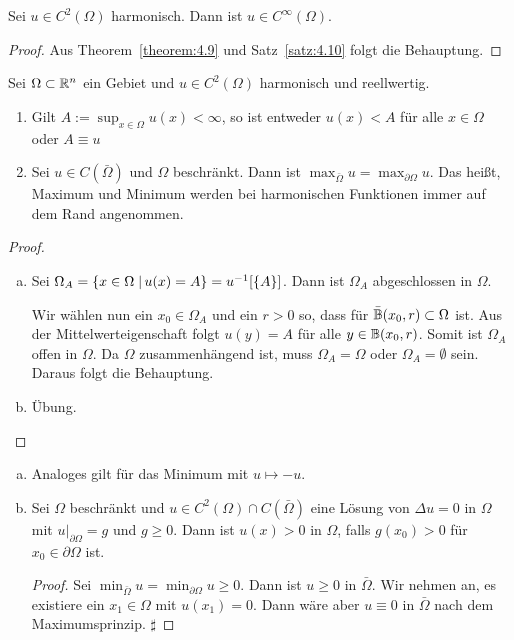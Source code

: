 \begin{kor}
  \label{kor:4.11}
  Sei $u\in C^2(\Omega)$ harmonisch. Dann ist $u\in C^\infty(\Omega)$.
\end{kor}

\begin{proof}
  Aus Theorem~\ref{theorem:4.9} und Satz~\ref{satz:4.10} folgt die Behauptung.
\end{proof}

\begin{theorem}
  \label{theorem:4.12}
  Sei $\Omega\subset\mathbb{R}^n$ ein Gebiet und $u\in C^2(\Omega)$ harmonisch und reellwertig.
  \begin{enumerate}[\rm(a)]
  \item Gilt $A:=\sup_{x\in\Omega}u(x)<\infty$, so ist entweder $u(x)<A$ für alle $x\in\Omega$ oder $A\equiv u$
  \item Sei $u\in C(\bar\Omega)$ und $\Omega$ beschränkt. Dann ist $\max_{\bar\Omega}u=\max_{\partial\Omega}u$. Das heißt, Maximum und Minimum werden bei harmonischen Funktionen immer auf dem Rand angenommen.
  \end{enumerate}
\end{theorem}

\begin{proof}
  \begin{enumerate}[(a)]
  \item Sei $\Omega_A=\{x\in\Omega\;\vert\, u(x)=A\}=u^{-1}[\{A\}]$. Dann ist $\Omega_A$ abgeschlossen in $\Omega$. 

    Wir wählen nun ein $x_0\in\Omega_A$ und ein $r>0$ so, dass für $\bar{\mathbb{B}}(x_0,r)\subset\Omega$ ist. Aus der Mittelwerteigenschaft folgt $u(y)=A$ für alle $y\in\mathbb{B}(x_0,r)$. Somit ist $\Omega_A$ offen in $\Omega$. Da $\Omega$ zusammenhängend ist, muss $\Omega_A=\Omega$ oder $\Omega_A=\emptyset$ sein. Daraus folgt die Behauptung.
  \item Übung.\qedhere
  \end{enumerate}
\end{proof}

\begin{bem}
  \begin{enumerate}[(a)]
  \item Analoges gilt für das Minimum mit $u\mapsto -u$.
  \item Sei $\Omega$ beschränkt und $u\in C^2(\Omega)\cap C(\bar\Omega)$ eine Lösung von $\Delta u=0$ in $\Omega$ mit $u\rvert_{\partial\Omega}=g$ und $g\geq 0$. Dann ist $u(x)>0$ in $\Omega$, falls $g(x_0)>0$ für $x_0\in\partial\Omega$ ist. 
    \begin{proof}
      Sei $\min_{\bar\Omega}u=\min_{\partial\Omega}u\geq0$. Dann ist $u\geq 0$ in $\bar\Omega$. Wir nehmen an, es existiere ein $x_1\in\Omega$ mit $u(x_1)=0$. Dann wäre aber $u\equiv0$ in $\bar\Omega$ nach dem Maximumsprinzip. $\sharp$
    \end{proof}
  \end{enumerate}
\end{bem}

